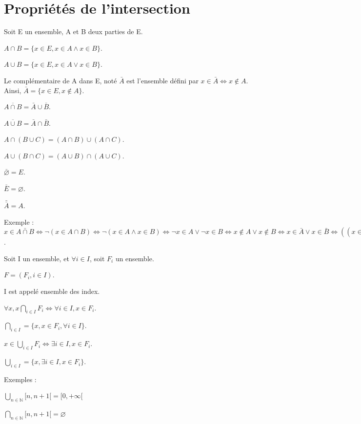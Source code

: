 \documentclass[french]{yLectureNote}
\begin{document}
\section{Propriétés de l'intersection}
Soit E un ensemble, A et B deux parties de E.

$A \cap B = \{x\in E, x\in A \wedge x\in B\}$.

$A \cup B = \{x\in E, x\in A \vee x\in B\}$.

\begin{theorem}[Def]
Le complémentaire de A dans E, noté $\bar{A}$ est l'ensemble défini par $x\in \bar{A} \iff x \notin A$. Ainsi, $\bar{A} = \{x\in E, x\notin A\}$.
\end{theorem}
\begin{theorem}[Propriétés]
$\overline{A\cap B} = \bar{A} \cup \bar{B}$.

$\overline{A\cup B} = \bar{A} \cap \bar{B}$.

$A\cap(B\cup C) = (A\cap B)\cup (A\cap C)$.

$A\cup (B\cap C) = (A\cup B)\cap (A\cup C)$.

$\bar{\varnothing} = E$.

$\bar{E} = \varnothing$.

$\bar{\bar{A}} = A$.
\end{theorem}


Exemple : $x\in \bar{A\cap B} \iff \neg(x\in A\cap B) \iff \neg(x\in A \wedge x \in B) \iff \neg x\in A \vee \neg x\in B \iff x\notin A \vee x\notin B \iff x\in \bar{A} \vee x\in \bar{B} \iff ((x\in \bar{A}) \vee (x\in \bar{B}))$.

\begin{theorem}[Definition]
Soit I un ensemble, et $\forall i\in I$, soit $F_i$ un ensemble.

$F = (F_i, i\in I)$.

I est appelé ensemble des index.

$\forall x, x \bigcap\limits_{i\in I} F_i \iff \forall i \in I, x \in F_i$.

$\bigcap\limits_{i\in I} = \{x, x\in F_i, \forall i \in I\}$.

$x\in \bigcup\limits_{i\in I} F_i \iff \exists i\in I, x \in F_i$.

$\bigcup\limits_{i\in I} = \{x, \exists i\in I, x\in F_i\}$.
\end{theorem}
Exemples :

$\bigcup\limits_{n\in \mathbb{N}} [n, n+1[ = [0,+\infty[$

$\bigcap\limits_{n\in \mathbb{N}} [n, n+1[ = \varnothing$
\end{document}
